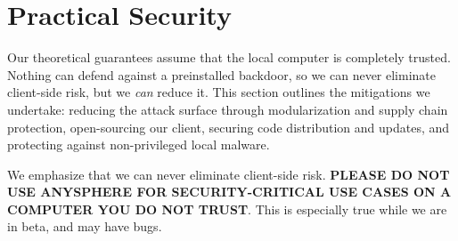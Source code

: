 \section{Practical Security} \label{sec:practical-security}


Our theoretical guarantees assume that the local computer is completely trusted. Nothing can defend against a preinstalled backdoor, so we can never eliminate client-side risk, but we \textit{can} reduce it. This section outlines the mitigations we undertake: reducing the attack surface through modularization and supply chain protection, open-sourcing our client, securing code distribution and updates, and protecting against non-privileged local malware.

We emphasize that we can never eliminate client-side risk. \textbf{PLEASE DO NOT USE ANYSPHERE FOR SECURITY-CRITICAL USE CASES ON A COMPUTER YOU DO NOT TRUST}. This is especially true while we are in beta, and may have bugs.





